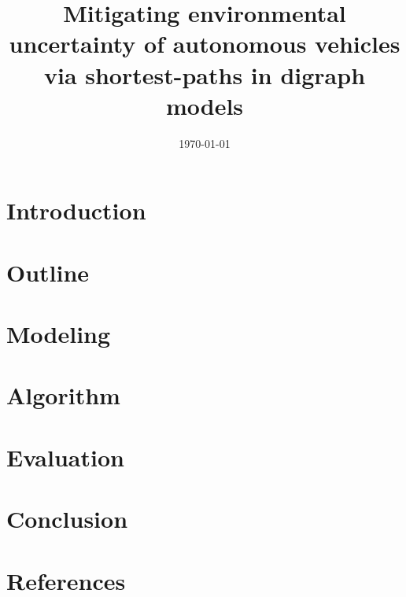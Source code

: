 \documentclass[draft]{article}
\title{Mitigating environmental uncertainty of autonomous vehicles via shortest-paths in digraph models}
\date{\today}
\begin{document}
\maketitle



\section{Introduction}


\section{Outline}


% 

\section{Modeling} \label{Modeling}


\section{Algorithm} \label{Algorithm}


\section{Evaluation} \label{Evaluation}


\section{Conclusion}



\newpage

\section{References}
\printbibliography
\end{document}
